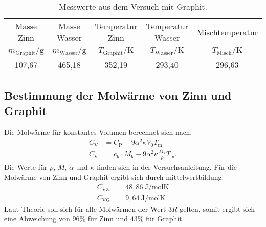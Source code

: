 \begin{table}
  \centering
  \caption{Messwerte aus dem Versuch mit Graphit.}
  \label{tab:graphit}
   \begin{tabular}{c c c c c}
\toprule
Masse Zinn & Masse Wasser & Temperatur Zinn & Temperatur Wasser  & Mischtemperatur \\
$m_\mathrm{Graphit}/\si{\gram}$ & $m_\mathrm{Wasser}/\si{\gram}$ & $T_\mathrm{Graphit}/\si{\kelvin}$ & $T_\mathrm{Wasser}/\si{\kelvin}$ & $T_\mathrm{Misch}/\si{\kelvin}$ \\
\midrule
107,67 & 465,18 & 352,19 & 293,40 & 296,63 \\
\bottomrule
\end{tabular}
\end{table}




\subsection{Bestimmung der Molwärme von Zinn und Graphit}
Die Molwärme für konstantes Volumen berechnet sich nach:
\begin{align}
  C_\mathrm{V} & =C_\mathrm{P}-9\alpha^2\kappa V_\mathrm{0}T_\mathrm{m}\\
  C_\mathrm{V} & =c_\mathrm{k}\cdot M_\mathrm{k}-9\alpha^2\kappa \frac{M_\mathrm{k}}{\rho}T_\mathrm{m}.
\end{align}
Die Werte für $\rho$, $M$, $\alpha$ und $\kappa$ finden sich in der Versuchsanleitung.
Für die Molwärme von Zinn und Graphit ergibt sich durch mittelwertbildung:
\begin{align*}
  C_\mathrm{VZ}&=48,86 \ \si{\joule\per\mol\kelvin}\\
  C_\mathrm{VG}&=9,64  \ \si{\joule\per\mol\kelvin}
\end{align*}
Laut Theorie soll sich für alle Molwärmen der Wert $3R$ gelten, somit ergibt sich
eine Abweichung von
$96\si{\percent}$
für Zinn und $43\si{\percent}$ für Graphit.
